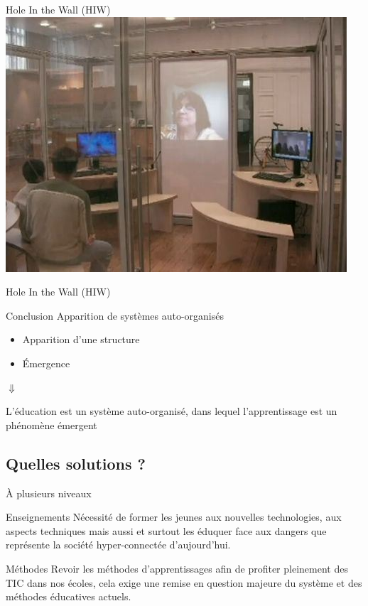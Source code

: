 \begin{frame}{Hole In the Wall (HIW)}
\includegraphics[width=.9\textwidth]{../resources/illustrations/soles.jpg}
\end{frame}

\begin{frame}{Hole In the Wall (HIW)}
  \begin{block}{Conclusion}
    Apparition de systèmes auto-organisés
    \begin{itemize}
      \item Apparition d'une structure
      \item Émergence
    \end{itemize}
    \pause
    \begin{center}
      $\Downarrow$
      
     \begin{coolquote}
      L'éducation est un système auto-organisé, dans lequel l'apprentissage est un phénomène émergent
    \end{coolquote}
    \end{center}
  \end{block}
\end{frame}

\subsection{Quelles solutions ?}

\begin{frame}{À plusieurs niveaux}
\begin{block}{Enseignements}
Nécessité de former les jeunes aux nouvelles technologies, aux aspects techniques mais aussi et surtout les éduquer face aux dangers que représente la société hyper-connectée d'aujourd'hui.
\end{block}
\begin{block}{Méthodes}
Revoir les méthodes d'apprentissages afin de profiter pleinement des TIC dans nos écoles, cela exige une remise en question majeure du système et des méthodes éducatives actuels.
\end{block}
\end{frame}


